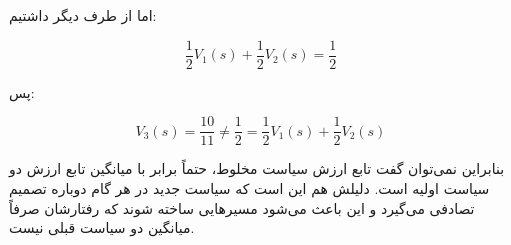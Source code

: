 \begin{parts}
اما از طرف دیگر داشتیم:

\[
\frac{1}{2}V_1(s)+\frac{1}{2}V_2(s)=\frac{1}{2}
\]

پس:

\[
V_3(s)=\frac{10}{11}
\neq
\frac{1}{2}
=
\frac{1}{2}V_1(s)+\frac{1}{2}V_2(s)
\]

بنابراین نمی‌توان گفت تابع ارزش سیاست مخلوط، حتماً برابر با میانگین تابع ارزش
دو سیاست اولیه است. دلیلش هم این است که سیاست جدید در هر گام دوباره تصمیم
تصادفی می‌گیرد و این باعث می‌شود مسیرهایی ساخته شوند که رفتارشان صرفاً میانگین
دو سیاست قبلی نیست.

\end{parts}
